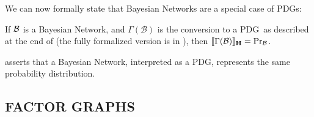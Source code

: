 \documentclass{article}
\newcommand\MaxEnt{_{\mathbf H}}
\newcommand{\MN}{PDG}
\newcommand{\MNs}{\MN s}
\numberwithin{equation}{section}
\begin{document}
\begin{notfocus}
	



	We can now formally state that Bayesian Networks are a special case of \MNs: 
	\begin{theorem}[restate=thmbnsRpdgs]\label{thm:bns-are-pdgs}
		If $\cal B$ is a Bayesian Network, and $\Gamma(\mathcal B)$ is the conversion to a \MN\ as described at the end of  (the fully formalized version is in ), then $\bbr{\Gamma(\mathcal B)}\MaxEnt = \Pr_{\cal B}$.
	\end{theorem}

	 asserts that a Bayesian Network, interpreted as a \MN, represents the same probability distribution.
	

	
	
	

	
	\setcounter{section}{4}
	\subsection{FACTOR GRAPHS} \label{sec:factor-graphs}


	

\end{notfocus}
\end{document}

